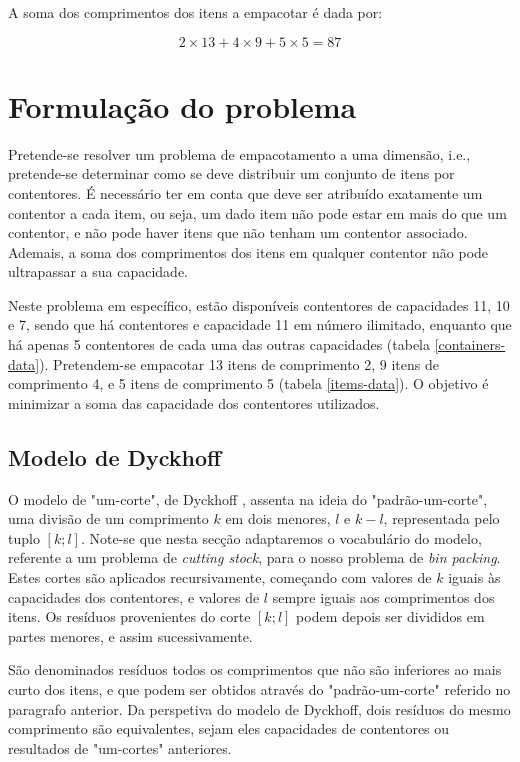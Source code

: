 \documentclass[12pt, a4paper, titlepage]{article}
\begin{document}
A soma dos comprimentos dos itens a empacotar é dada por:

$$2 \times 13 + 4 \times 9 + 5 \times 5 = 87$$

\section{Formulação do problema}

Pretende-se resolver um problema de empacotamento a uma dimensão, i.e., pretende-se determinar como
se deve distribuir um conjunto de itens por contentores. É necessário ter em conta que deve ser
atribuído exatamente um contentor a cada item, ou seja, um dado item não pode estar em mais do que
um contentor, e não pode haver itens que não tenham um contentor associado. Ademais, a soma dos
comprimentos dos itens em qualquer contentor não pode ultrapassar a sua capacidade.

Neste problema em específico, estão disponíveis contentores de capacidades 11, 10 e 7, sendo que há
contentores e capacidade 11 em número ilimitado, enquanto que há apenas 5 contentores de cada uma
das outras capacidades (tabela \ref{containers-data}). Pretendem-se empacotar 13 itens de
comprimento 2, 9 itens de comprimento 4, e 5 itens de comprimento 5 (tabela \ref{items-data}). O
objetivo é minimizar a soma das capacidade dos contentores utilizados.

\subsection{Modelo de Dyckhoff}

O modelo de "um-corte"{}, de Dyckhoff \cite{dyckhoff}, assenta na ideia do "padrão-um-corte", uma
divisão de um comprimento $k$ em dois menores, $l$ e $k - l$, representada pelo tuplo $[k; l]$.
Note-se que nesta secção adaptaremos o vocabulário do modelo, referente a um problema de
\emph{cutting stock}, para o nosso problema de \emph{bin packing}. Estes cortes são aplicados
recursivamente, começando com valores de $k$ iguais às capacidades dos contentores, e valores de $l$
sempre iguais aos comprimentos dos itens. Os resíduos provenientes do corte $[k; l]$ podem depois
ser divididos em partes menores, e assim sucessivamente.

São denominados resíduos todos os comprimentos que não são inferiores ao mais curto dos itens, e
que podem ser obtidos através do "padrão-um-corte"{} referido no paragrafo anterior. Da perspetiva
do modelo de Dyckhoff, dois resíduos do mesmo comprimento são equivalentes, sejam eles capacidades
de contentores ou resultados de "um-cortes"{} anteriores.
\end{document}
